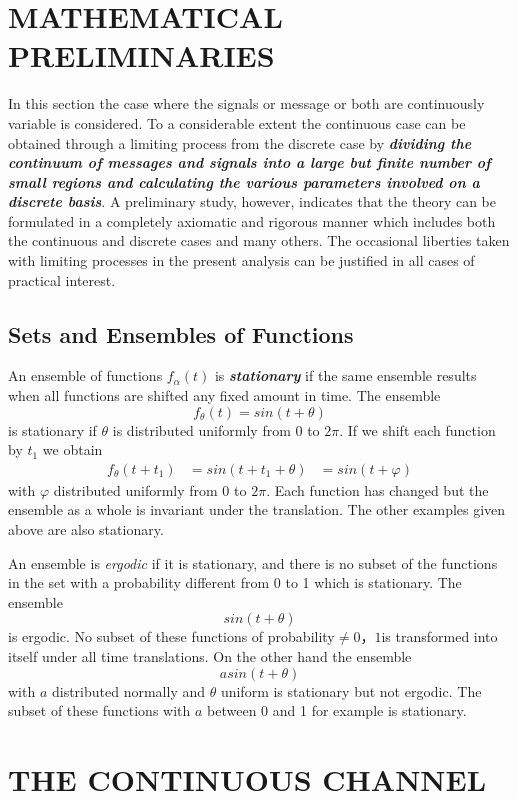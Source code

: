 \documentclass[conference]{IEEEtran}
\begin{document}
\section{MATHEMATICAL PRELIMINARIES}

In this section the case where the signals or message or both are continuously variable is considered. To a considerable extent the continuous case can be obtained through a limiting process from the discrete case by \emph{\textbf{dividing the continuum of messages and signals into a large but finite number of small regions and calculating the various parameters involved on a discrete basis}}. A preliminary study, however, indicates that the theory can be formulated in a completely axiomatic and rigorous manner which includes both the continuous and discrete cases and many others. The occasional liberties taken with limiting processes in the present analysis can be justified in all cases of practical interest.

\subsection{Sets and Ensembles of Functions}
An ensemble of functions $f_{\alpha}(t)$ is \emph{\textbf{stationary}} if the same ensemble results when all functions are shifted any fixed amount in time. The ensemble
\begin{equation*}
f_{\theta}(t)=sin(t+\theta)
\end{equation*}
is stationary if $\theta$ is distributed uniformly from $0$ to $2\pi$. If we shift each function by $t_1$ we obtain
\begin{align*}
f_{\theta}(t+t_1) &= sin(t+t_1+\theta)
&=sin(t+\varphi)
\end{align*}
with $\varphi$ distributed uniformly from $0$ to $2\pi$. Each function has changed but the ensemble as a whole is invariant under the translation. The other examples given above are also stationary.

An ensemble is \emph{ergodic} if it is stationary, and there is no subset of the functions in the set with a probability different from 0 to 1 which is stationary. The ensemble
\begin{equation*}
sin(t+\theta)
\end{equation*}
is ergodic. No subset of these functions of probability$ \neq 0，1 $is transformed into itself under all time translations. On the other hand the ensemble
\begin{equation*}
asin(t+\theta)
\end{equation*}
with $a$ distributed normally and $\theta$ uniform is stationary but not ergodic. The subset of these functions with $a$ between 0 and 1 for example is stationary.

\section{THE CONTINUOUS CHANNEL}



\end{document}
